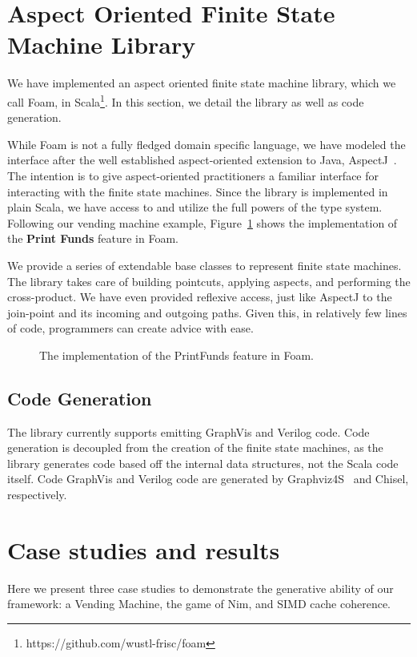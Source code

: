 \documentclass[sigplan,anonymous,review]{acmart}
\begin{document}
\section{Aspect Oriented Finite State Machine Library}\label{sec:foam}
We have implemented an aspect oriented finite state machine library, which we call Foam,  in Scala\footnote{https://github.com/wustl-frisc/foam}. In this section, we detail the library as well as code generation.

While Foam is not a fully fledged domain specific language, we have modeled the interface after the well established aspect-oriented extension to Java, AspectJ~\cite{}. The intention is to give aspect-oriented practitioners a familiar interface for interacting with the finite state machines. Since the library is implemented in plain Scala, we have access to and utilize the full powers of the type system. Following our vending machine example, Figure~\ref{lst:PrintFunds} shows the implementation of the \textbf{Print Funds} feature in Foam.

We provide a series of extendable base classes to represent finite state machines. The library takes care of building pointcuts, applying aspects, and performing the cross-product. We have even provided reflexive access, just like AspectJ to the join-point and its incoming and outgoing paths. Given this, in relatively few lines of code, programmers can create advice with ease.

\begin{figure}
    \centering
    
    \caption{The implementation of the PrintFunds feature in Foam.}
    \label{lst:PrintFunds}
\end{figure}

\subsection{Code Generation}
The library currently supports emitting GraphVis and Verilog code. Code generation is decoupled from the creation of the finite state machines, as the library generates code based off the internal data structures, not the Scala code itself. Code GraphVis and Verilog code are generated by Graphviz4S~\cite{} and Chisel, respectively. 

\section{Case studies and results}\label{sec:results}
Here we present three case studies to demonstrate the generative ability of our framework: a Vending Machine, the game of Nim, and SIMD cache coherence.
\end{document}
